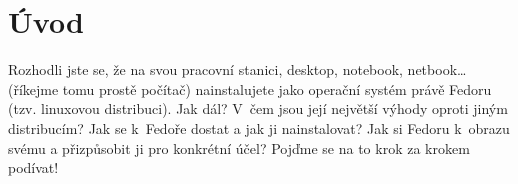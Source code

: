 \chapter*{Úvod}
Rozhodli jste se, že na svou pracovní stanici, desktop, notebook, netbook\dots (říkejme tomu prostě počítač) nainstalujete jako operační systém právě Fedoru (tzv. linuxovou distribuci). Jak dál? V~čem jsou její největší výhody oproti jiným distribucím? Jak se k~Fedoře dostat a jak ji nainstalovat? Jak si Fedoru  k~obrazu svému a přizpůsobit ji pro konkrétní účel? Pojďme se na to krok za krokem podívat!
